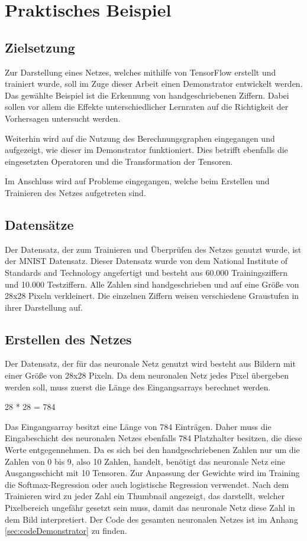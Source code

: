 \chapter{Praktisches Beispiel}
\label{chap:praktischesBeispiel}
\section{Zielsetzung}
\label{sec:zielsetzung}
\printsubchapterauthor{\authorMarco}
Zur Darstellung eines Netzes, welches mithilfe von TensorFlow erstellt und trainiert wurde, soll im Zuge dieser Arbeit einen Demonstrator entwickelt werden. Das gewählte Beispiel ist die Erkennung von handgeschriebenen Ziffern. Dabei sollen vor allem die Effekte unterschiedlicher Lernraten auf die Richtigkeit der Vorhersagen untersucht werden.

Weiterhin wird auf die Nutzung des Berechnungsgraphen eingegangen und aufgezeigt, wie dieser im Demonstrator funktioniert. Dies betrifft ebenfalls die eingesetzten Operatoren und die Transformation der Tensoren.

Im Anschluss wird auf Probleme eingegangen, welche beim Erstellen und Trainieren des Netzes aufgetreten sind.

\section{Datensätze}
\label{sec:datensaetze}
\printsubchapterauthor{\authorMarco}
Der Datensatz, der zum Trainieren und Überprüfen des Netzes genutzt wurde, ist der MNIST Datensatz. Dieser Datensatz wurde von dem National Institute of Standards and Technology angefertigt und besteht aus 60.000 Trainingsziffern und 10.000 Testziffern. Alle Zahlen sind handgeschrieben und auf eine Größe von 28x28 Pixeln verkleinert. Die einzelnen Ziffern weisen verschiedene Graustufen in ihrer Darstellung auf.

\section{Erstellen des Netzes}
\label{sec:erstellenDesNetzes}
\printsubchapterauthor{\authorNiklas}
Der Datensatz, der für das neuronale Netz genutzt wird besteht aus Bildern mit einer Größe von 28x28 Pixeln. Da dem neuronalen Netz jedes Pixel übergeben werden soll, muss zuerst die Länge des Eingangsarrays berechnet werden.
\begin{center} 28 * 28 = 784\end{center}
Das Eingangsarray besitzt eine Länge von 784 Einträgen. Daher muss die Eingabeschicht des neuronalen Netzes ebenfalls 784 Platzhalter besitzen, die diese Werte entgegennehmen. Da es sich bei den handgeschriebenen Zahlen nur um die Zahlen von 0 bis 9, also 10 Zahlen, handelt, benötigt das neuronale Netz eine Ausgangsschicht mit 10 Tensoren. Zur Anpassung der Gewichte wird im Training die Softmax-Regression oder auch logistische Regression verwendet. Nach dem Trainieren wird zu jeder Zahl ein Thumbnail angezeigt, das darstellt, welcher Pixelbereich ungefähr gesetzt sein muss, damit das neuronale Netz diese Zahl in dem Bild interpretiert. Der Code des gesamten neuronalen Netzes ist im Anhang \ref{sec:codeDemonstrator} zu finden.

